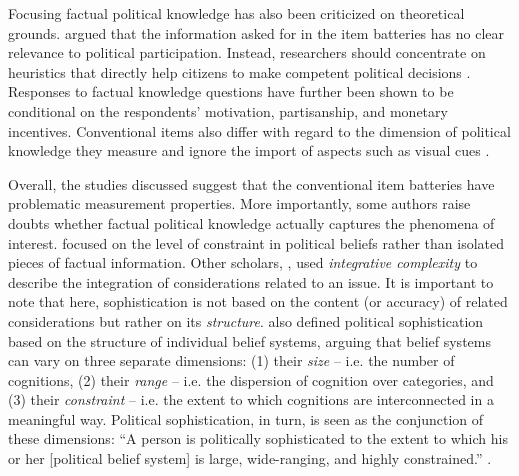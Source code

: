 \documentclass[12pt]{article}
\begin{document}
Focusing factual political knowledge has also been criticized on theoretical grounds. \citet{lupia2006elitism} argued that the information asked for in the item batteries has no clear relevance to political participation. Instead, researchers should concentrate on heuristics that directly help citizens to make competent political decisions \citep[see also][]{lupia1994shortcuts}. Responses to factual knowledge questions have further been shown to be conditional on the respondents' motivation, partisanship, and monetary incentives\citep{prior2008money,bullock2015partisan,prior2015you}. Conventional items also differ with regard to the dimension of political knowledge they measure \citep{barabas2014question} and ignore the import of aspects such as visual cues \citep{prior2014visual}.

Overall, the studies discussed suggest that the conventional item batteries have problematic measurement properties. More importantly, some authors raise doubts whether factual political knowledge actually captures the phenomena of interest. \citet{converse1964nature} focused on the level of constraint in political beliefs rather than isolated pieces of factual information. Other scholars, \citet{tetlock1983cognitive}, used \textit{integrative complexity} to describe the integration of considerations related to an issue. It is important to note that here, sophistication is not based on the content (or accuracy) of related considerations but rather on its \textit{structure}. \citet{luskin1987measuring} also defined political sophistication based on the structure of individual belief systems, arguing that belief systems can vary on three separate dimensions: (1) their \textit{size} -- i.e. the number of cognitions, (2) their \textit{range} -- i.e. the dispersion of cognition over categories, and (3) their \textit{constraint} -- i.e. the extent to which cognitions are interconnected in a meaningful way. Political sophistication, in turn, is seen as the conjunction of these dimensions: ``A person is politically sophisticated to the extent to which his or her [political belief system] is large, wide-ranging, and highly constrained.'' \citep[860]{luskin1987measuring}.
\end{document}
